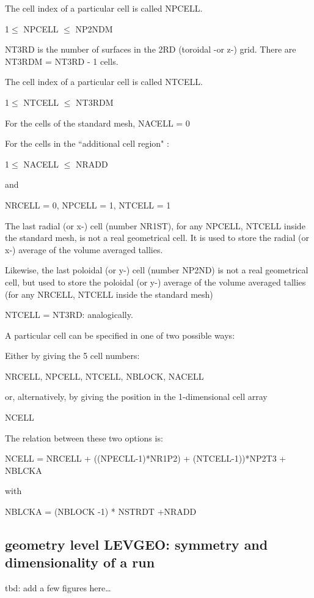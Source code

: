 The cell index of a particular cell is called NPCELL.

1$\le$ NPCELL $\le$ NP2NDM

NT3RD is the number of surfaces in the 2RD (toroidal -or z-) grid.
There are NT3RDM = NT3RD - 1 cells.

The cell index of a particular cell is called NTCELL.

1$\le$ NTCELL $\le$ NT3RDM

For the cells of the standard mesh, NACELL = 0 

For the cells in the ``additional cell region" :

1$\le$ NACELL $\le$ NRADD

and

NRCELL = 0, NPCELL = 1, NTCELL = 1 

\medskip 

The last radial (or x-) cell (number NR1ST), for any NPCELL, NTCELL inside the
standard mesh, is not a real geometrical cell.
It is used to store the radial (or x-) average of the volume averaged tallies.

Likewise, the last poloidal (or y-) cell (number NP2ND) is not a real
geometrical cell, but used to store the poloidal (or y-) average of the volume
averaged tallies (for any NRCELL, NTCELL inside the standard mesh)

NTCELL = NT3RD: analogically.

\medskip

A particular cell can be specified in one of two possible ways:

Either by giving the 5 cell numbers:

NRCELL, NPCELL, NTCELL, NBLOCK, NACELL 

or, alternatively, by giving the position in the 1-dimensional cell array

NCELL 

\medskip 

The relation between these two options is:

NCELL = NRCELL + ((NPECLL-1)*NR1P2) + (NTCELL-1))*NP2T3 + NBLCKA

with 

NBLCKA = (NBLOCK -1) * NSTRDT +NRADD 

\subsection{geometry level LEVGEO: symmetry and dimensionality of a run}
\label{sec2.2.2} 

tbd: add a few figures here\dots 

